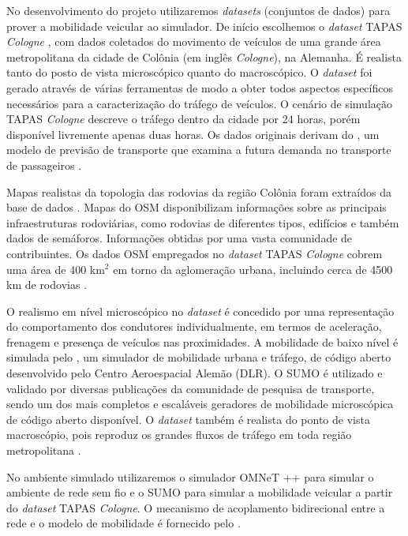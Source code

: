 \documentclass[mestrado, pre-defesa, english, brazil]{packages/icmc}
\begin{document}
No desenvolvimento do projeto utilizaremos \textit{datasets} (conjuntos de dados) para prover a mobilidade veicular ao simulador. De início escolhemos o \textit{dataset} TAPAS \textit{Cologne} \cite{tapas-2014}, com dados coletados do movimento de veículos de uma grande área metropolitana da cidade de Colônia (em inglês \textit{Cologne}), na Alemanha. É realista tanto do posto de vista microscópico quanto do macroscópico. O \textit{dataset} foi gerado através de várias ferramentas de modo a obter todos aspectos específicos necessários para a caracterização do tráfego de veículos. O cenário de simulação TAPAS \textit{Cologne} descreve o tráfego dentro da cidade por 24 horas, porém disponível livremente apenas duas horas. Os dados originais derivam do , um modelo de previsão de transporte que examina a futura demanda no transporte de passageiros \cite{uppoor-2012,tapas-2014}.

Mapas realistas da topologia das rodovias da região Colônia foram extraídos da base de dados . Mapas do OSM disponibilizam informações sobre as principais infraestruturas rodoviárias, como rodovias de diferentes tipos, edifícios e também dados de semáforos. Informações obtidas por uma vasta comunidade de contribuintes. Os dados OSM empregados no \textit{dataset} TAPAS \textit{Cologne} cobrem uma área de 400 km$^{2}$ em torno da aglomeração urbana, incluindo cerca de 4500 km de rodovias \cite{tapas-2014,uppoor-2012}.

O realismo em nível microscópico no \textit{dataset} é concedido por uma representação do comportamento dos condutores individualmente, em termos de aceleração, frenagem e presença de veículos nas proximidades. A mobilidade de baixo nível é simulada pelo  \cite{SUMO-2012, Sumo-2014}, um simulador de mobilidade urbana e tráfego, de código aberto desenvolvido pelo Centro Aeroespacial Alemão (DLR). O SUMO é utilizado e validado por diversas publicações da comunidade de pesquisa de transporte, sendo um dos mais completos e escaláveis geradores de mobilidade microscópica de código aberto disponível. O \textit{dataset} também é realista do ponto de vista macroscópio, pois reproduz os grandes fluxos de tráfego em toda região metropolitana \cite{uppoor-2012,tapas-2014}.

No ambiente simulado utilizaremos o simulador OMNeT ++ \cite{OMNeT++-2014} para simular o ambiente de rede sem fio e o SUMO para simular a mobilidade veicular a partir do \textit{dataset} TAPAS \textit{Cologne}. O mecanismo de acoplamento bidirecional entre a rede e o modelo de mobilidade é fornecido pelo  \cite{Veins-2014}.
\end{document}
